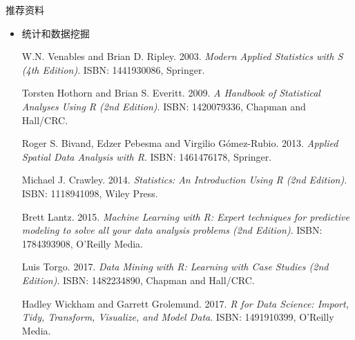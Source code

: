 \begin{frame}[t]{推荐资料}{}
\begin{itemize}
\item 统计和数据挖掘
\begin{thebibliography}{10} \footnotesize

{\beamertemplatebookbibitems
W.N. Venables and Brian D. Ripley. 2003. \emph{Modern Applied Statistics with S (4th Edition)}. ISBN: 1441930086, Springer.}

{\beamertemplatebookbibitems
Torsten Hothorn and Brian S. Everitt. 2009. \emph{A Handbook of Statistical Analyses Using R (2nd Edition)}. ISBN: 1420079336, Chapman and Hall/CRC.}

{\beamertemplatebookbibitems
Roger S. Bivand, Edzer Pebesma and Virgilio Gómez-Rubio. 2013. \emph{Applied Spatial Data Analysis with R}. ISBN: 1461476178, Springer.}

{\beamertemplatebookbibitems
Michael J. Crawley. 2014. \emph{Statistics: An Introduction Using R (2nd Edition)}. ISBN: 1118941098, Wiley Press.}

{\beamertemplatebookbibitems
Brett Lantz. 2015. \emph{Machine Learning with R: Expert techniques for predictive modeling to solve all your data analysis problems (2nd Edition)}. ISBN: 1784393908, O'Reilly Media.}

{\beamertemplatebookbibitems
Luis Torgo. 2017. \emph{Data Mining with R: Learning with Case Studies (2nd Edition)}. ISBN: 1482234890, Chapman and Hall/CRC.}

{\beamertemplatebookbibitems
Hadley Wickham and Garrett Grolemund. 2017. \emph{R for Data Science: Import, Tidy, Transform, Visualize, and Model Data}. ISBN: 1491910399, O'Reilly Media.}

\end{thebibliography}
\end{itemize}
\end{frame}

